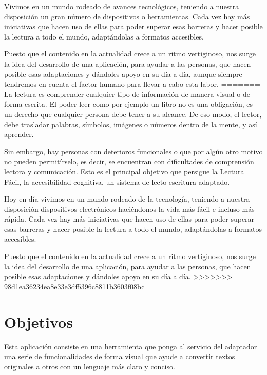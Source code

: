 \setlength{\parskip}{10pt}
Vivimos en un mundo rodeado de avances tecnológicos, teniendo a nuestra disposición un gran número de dispositivos o herramientas. Cada vez hay más iniciativas que hacen uso de ellas para poder superar esas barreras y hacer posible la lectura a todo el mundo, adaptándolas a formatos accesibles. 

 \setlength{\parskip}{10pt}
 
Puesto que el contenido en la actualidad crece a un ritmo vertiginoso, nos surge la idea del desarrollo de una aplicación, para ayudar a las personas, que hacen posible esas adaptaciones y dándoles apoyo en su día a día, aunque siempre tendremos en cuenta el factor humano para llevar a cabo esta labor.
=======
La lectura es comprender cualquier tipo de información de manera visual o de forma escrita. El poder leer como por ejemplo un libro no es una obligación, es un derecho que cualquier persona debe tener a su alcance. De eso modo, el lector, debe trasladar palabras, símbolos, imágenes o números dentro de la mente, y así aprender.

 \setlength{\parskip}{10pt}

 Sin embargo, hay personas con deterioros funcionales o que por algún otro motivo no pueden permitírselo, es decir, se encuentran con dificultades de comprensión lectora y comunicación. Esto es el principal objetivo que persigue la Lectura Fácil, la accesibilidad cognitiva, un sistema de lecto-escritura adaptado.
 
 \setlength{\parskip}{10pt}
 
Hoy en día vivimos en un mundo rodeado de la tecnología, teniendo a nuestra disposición dispositivos electrónicos haciéndonos la vida más fácil e incluso más rápida. Cada vez hay más iniciativas que hacen uso de ellas para poder superar esas barreras y hacer posible la lectura a todo el mundo, adaptándolas a formatos accesibles. 

 \setlength{\parskip}{10pt}
 
Puesto que el contenido en la actualidad crece a un ritmo vertiginoso, nos surge la idea del desarrollo de una aplicación, para ayudar a las personas, que hacen posible esas adaptaciones y dándoles apoyo en su día a día.
>>>>>>> 98d1ea36234ea8e33e3df5396c8811b3603f08bc


\section{Objetivos}
Esta aplicación consiste en una herramienta que ponga al servicio del adaptador una serie de funcionalidades de forma visual que ayude a convertir textos originales a otros con un lenguaje más claro y conciso.

